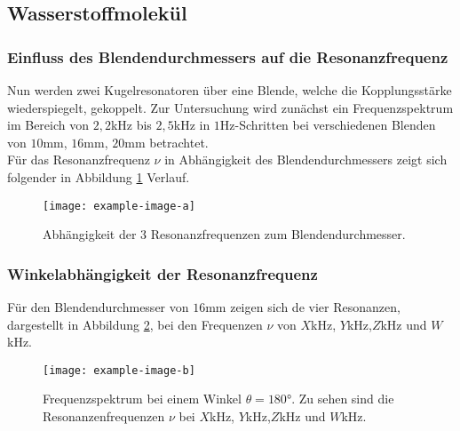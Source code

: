 \subsection{Wasserstoffmolekül}
\subsubsection*{Einfluss des Blendendurchmessers auf die Resonanzfrequenz}
Nun werden zwei Kugelresonatoren über eine Blende, welche die Kopplungsstärke wiederspiegelt, gekoppelt.
Zur Untersuchung wird zunächst ein Frequenzspektrum im Bereich von $2,2$kHz bis $2,5$kHz in $1$Hz-Schritten bei verschiedenen
Blenden von $10$mm, $16$mm, $20$mm betrachtet.\\

Für das Resonanzfrequenz $\nu$ in Abhängigkeit des Blendendurchmessers zeigt sich folgender in Abbildung \ref{fig:blende_mol}
Verlauf.
\begin{figure}[H]
    \center
    \texttt{[image: example-image-a]}
    \caption{Abhängigkeit der 3 Resonanzfrequenzen zum Blendendurchmesser.}
    \label{fig:blende_mol}
\end{figure}

\subsubsection*{Winkelabhängigkeit der Resonanzfrequenz}
Für den Blendendurchmesser von $16$mm zeigen sich de vier Resonanzen, dargestellt in Abbildung \ref{fig:blende_16_res},
bei den Frequenzen $\nu$ von $X$kHz, $Y$kHz,$Z$kHz und $W$kHz.
\begin{figure}[H]
    \center
    \texttt{[image: example-image-b]}
    \caption{Frequenzspektrum bei einem Winkel $\theta=180°$. Zu sehen sind die Resonanzenfrequenzen $\nu$ bei $X$kHz, $Y$kHz,$Z$kHz und $W$kHz.}
    \label{fig:blende_16_res}
\end{figure}


